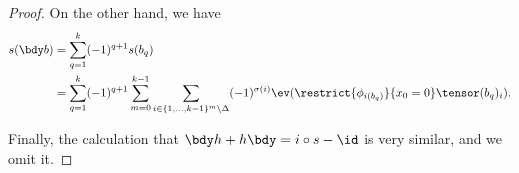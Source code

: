 \begin{proof}
On the other hand, we have
\begin{align*}
s(\bdy b) & = \sum_{q=1}^k (-1)^{q+1} s(b_q) \\
	       & = \sum_{q=1}^k (-1)^{q+1} \sum_{m=0}^{k-1} \sum_{i \in \{1, \ldots, k-1\}^{m} \setminus \Delta} (-1)^{\sigma(i)}  \ev(\restrict{\phi_{i(b_q)}}{x_0 = 0} \tensor (b_q)_i).
\end{align*}

Finally, the calculation that $\bdy h+h \bdy=i\circ s - \id$ is very similar, and we omit it.
\end{proof}
